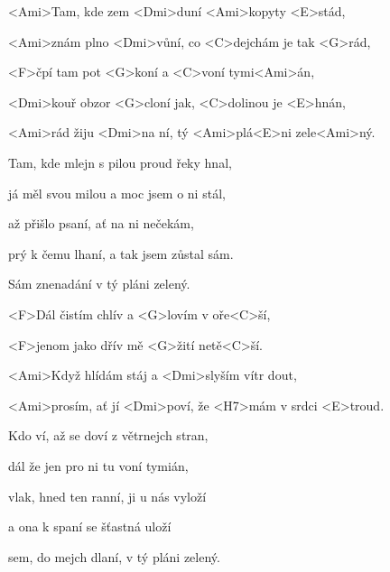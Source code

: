 

\zs
<Ami>Tam, kde zem <Dmi>duní <Ami>kopyty <E>stád,

<Ami>znám plno <Dmi>vůní, co <C>dejchám je tak <G>rád,

<F>čpí tam pot <G>koní a <C>voní tymi<Ami>án,

<Dmi>kouř obzor <G>cloní jak, <C>dolinou je <E>hnán,

<Ami>rád žiju <Dmi>na ní, tý <Ami>plá<E>ni zele<Ami>ný.
\ks

\zs
Tam, kde mlejn s pilou proud řeky hnal,

já měl svou milou a moc jsem o ni stál,

až přišlo psaní, ať na ni nečekám,

prý k čemu lhaní, a tak jsem zůstal sám.

Sám znenadání v tý pláni zelený.
\ks

\zr
<F>Dál čistím chlív a <G>lovím v oře<C>ší,

<F>jenom jako dřív mě <G>žití netě<C>ší.

<Ami>Když hlídám stáj a <Dmi>slyším vítr dout,

<Ami>prosím, ať jí <Dmi>poví, že <H7>mám v srdci <E>troud.
\kr

\zs
Kdo ví, až se doví z větrnejch stran,

dál že jen pro ni tu voní tymián,

vlak, hned ten ranní, ji u nás vyloží

a ona k spaní se šťastná uloží

sem, do mejch dlaní, v tý pláni zelený.
\ks

\kp
